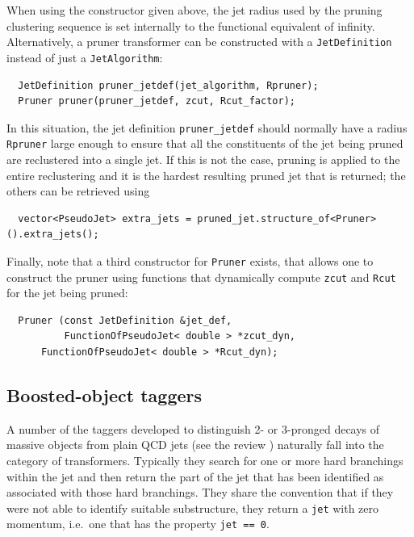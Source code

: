 \documentclass[12pt,a4]{article}
\newcommand{\ttt}[1]{{\small\texttt{#1}}}
\begin{document}
When using the constructor given above, the jet radius used by the pruning clustering 
sequence is set internally to the functional equivalent of infinity. Alternatively, 
a pruner transformer can be constructed with a \ttt{JetDefinition} instead of just a
\ttt{JetAlgorithm}:
\begin{lstlisting}
  JetDefinition pruner_jetdef(jet_algorithm, Rpruner);
  Pruner pruner(pruner_jetdef, zcut, Rcut_factor);
\end{lstlisting}
In this situation, the jet definition \ttt{pruner\_jetdef} should normally have a radius
\ttt{Rpruner}
large enough to ensure that
all the constituents of the jet being pruned are reclustered into a single jet. 
%
If this is not the case, pruning is applied to the entire reclustering
and it is the hardest resulting pruned jet that is returned; the
others can be retrieved using
\begin{lstlisting}
  vector<PseudoJet> extra_jets = pruned_jet.structure_of<Pruner>().extra_jets();
\end{lstlisting}

Finally, note that a third constructor for \ttt{Pruner} exists, that allows one
to construct the pruner using functions that dynamically compute \ttt{zcut} and
\ttt{Rcut} for the jet being pruned:
\begin{lstlisting}
  Pruner (const JetDefinition &jet_def, 
          FunctionOfPseudoJet< double > *zcut_dyn, 
	  FunctionOfPseudoJet< double > *Rcut_dyn);
\end{lstlisting}



\subsection{Boosted-object taggers}
\label{sec:taggers}

A number of the taggers developed to distinguish 2- or 3-pronged
decays of massive objects from plain QCD jets (see the review
\cite{Abdesselam:2010pt}) naturally fall into the category of
transformers.
%
Typically they search for one or more hard branchings within the jet
and then return the part of the jet that has been identified as
associated with those hard branchings.
%
They share the convention that if they were not able to identify
suitable substructure, they return a \ttt{jet} with zero momentum,
i.e.\ one that has the property \ttt{jet == 0}.
\end{document}
